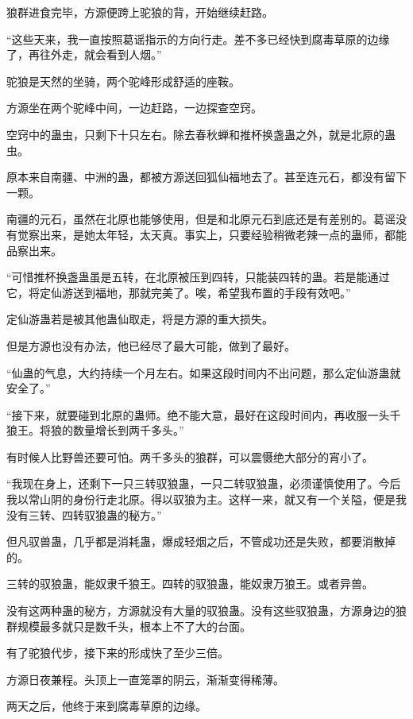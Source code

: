 
\begin{this_body}

狼群进食完毕，方源便跨上驼狼的背，开始继续赶路。

“这些天来，我一直按照葛谣指示的方向行走。差不多已经快到腐毒草原的边缘了，再往外走，就会看到人烟。”

驼狼是天然的坐骑，两个驼峰形成舒适的座鞍。

方源坐在两个驼峰中间，一边赶路，一边探查空窍。

空窍中的蛊虫，只剩下十只左右。除去春秋蝉和推杯换盏蛊之外，就是北原的蛊虫。

原本来自南疆、中洲的蛊，都被方源送回狐仙福地去了。甚至连元石，都没有留下一颗。

南疆的元石，虽然在北原也能够使用，但是和北原元石到底还是有差别的。葛谣没有觉察出来，是她太年轻，太天真。事实上，只要经验稍微老辣一点的蛊师，都能品察出来。

“可惜推杯换盏蛊虽是五转，在北原被压到四转，只能装四转的蛊。若是能通过它，将定仙游送到福地，那就完美了。唉，希望我布置的手段有效吧。”

定仙游蛊若是被其他蛊仙取走，将是方源的重大损失。

但是方源也没有办法，他已经尽了最大可能，做到了最好。

“仙蛊的气息，大约持续一个月左右。如果这段时间内不出问题，那么定仙游蛊就安全了。”

“接下来，就要碰到北原的蛊师。绝不能大意，最好在这段时间内，再收服一头千狼王。将狼的数量增长到两千多头。”

有时候人比野兽还要可怕。两千多头的狼群，可以震慑绝大部分的宵小了。

“我现在身上，还剩下一只三转驭狼蛊，一只二转驭狼蛊，必须谨慎使用了。今后我以常山阴的身份行走北原。得以驭狼为主。这样一来，就又有一个关隘，便是我没有三转、四转驭狼蛊的秘方。”

但凡驭兽蛊，几乎都是消耗蛊，爆成轻烟之后，不管成功还是失败，都要消散掉的。

三转的驭狼蛊，能奴隶千狼王。四转的驭狼蛊，能奴隶万狼王。或者异兽。

没有这两种蛊的秘方，方源就没有大量的驭狼蛊。没有这些驭狼蛊，方源身边的狼群规模最多就只是数千头，根本上不了大的台面。

有了驼狼代步，接下来的形成快了至少三倍。

方源日夜兼程。头顶上一直笼罩的阴云，渐渐变得稀薄。

两天之后，他终于来到腐毒草原的边缘。


\end{this_body}
